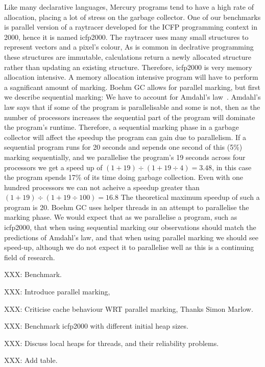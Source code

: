 Like many declarative languages,
Mercury programs tend to have a high rate of allocation,
placing a lot of stress on the garbage collector.
One of our benchmarks is parallel version of a raytracer developed for the
ICFP programming context in 2000,
hence it is named icfp2000.
The raytracer uses many small structures to represent vectors and a pixel's
colour,
As is common in declrative programming these structures are immutable,
calculations return a newly allocated structure rather than updating an
existing structure.
Therefore,
icfp2000 is very memory allocation intensive.
A memory allocation intensive program will have to perform a sagnificant
amount of marking.
Boehm GC allows for parallel marking,
but first we describe sequential marking:
We have to account for Amdahl's law~\citep{amdahl}.
Amdahl's law says that if some of the program is parallelisable and some
is not,
then as the number of processors increases the sequential part of the
program will dominate the program's runtime.
Therefore,
a sequential marking phase in a garbage collector will affect the speedup
the program can gain due to parallelism.
If a sequential program runs for 20 seconds and sepends one second of this
(5\%) marking sequentially,
and we parallelise the program's 19 seconds across four processors we get
a speed up of
$(1 + 19) \div (1 + 19\div4) = 3.48$,
in this case the program spends 17\% of its time doing garbage collection.
Even with one hundred processors we can not acheive a speedup greater than
$(1 + 19) \div (1 + 19\div100) = 16.8$
The theoretical maximum speedup of such a program is 20.
Boehm GC uses helper threads in an attempt to parallelise the marking phase.
We would expect that as we parallelise a program,
such as icfp2000,
that when using sequential marking our observations should match the
predictions of Amdahl's law,
and that when using parallel marking we should see speed-up,
although we do not expect it to parallelise well
as this is a continuing field of research.

XXX: Benchmark.



XXX: Introduce parallel marking,

XXX: Criticise cache behaviour WRT parallel marking,
Thanks Simon Marlow.

XXX: Benchmark icfp2000 with different initial heap sizes.

XXX: Discuss local heaps for threads, and their reliability problems.

XXX: Add table.

